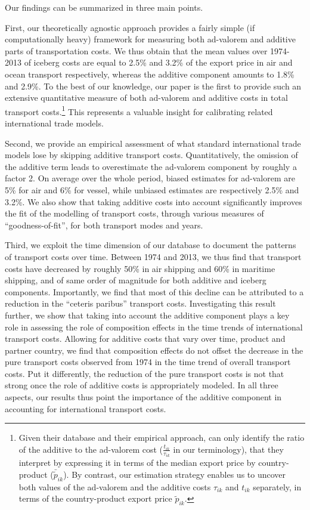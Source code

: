 \documentclass[a4paper,11pt]{article}
\begin{document}
Our findings can be summarized in three main points.

First, our theoretically agnostic approach provides a fairly simple (if computationally heavy) framework for measuring both ad-valorem and additive parts of transportation costs. We thus obtain that the mean values over 1974-2013 of iceberg costs are equal to 2.5\% and 3.2\% of the export price in air and ocean transport respectively, whereas the additive component amounts to 1.8\% and 2.9\%. To the best of our knowledge, our paper is the first to provide such an extensive quantitative measure of both ad-valorem and additive costs in total transport costs.\footnote{Given their database and their empirical approach, \citet{Irrazabal_2015} can only identify the ratio of the additive to the ad-valorem cost ($\frac{t_{ik}}{\tau_{ik}}$ in our terminology), that they interpret by expressing it in terms of the median export price by country-product ($\bar{\widetilde{p}}_{ik}$). By contrast, our estimation strategy enables us to uncover both values of the ad-valorem and the additive costs $\tau_{ik}$ and $t_{ik}$ separately, in terms of the country-product export price $\widetilde{p}_{ik}$.}  This represents a valuable insight for calibrating related international trade models.

Second, we provide an empirical assessment of what standard international trade models lose by skipping additive transport costs. Quantitatively, the omission of the additive term leads to overestimate the ad-valorem component by roughly a factor 2. On average over the whole period, biased estimates for ad-valorem are 5\% for air and 6\% for vessel, while unbiased estimates are respectively 2.5\% and 3.2\%. We also show that taking additive costs into account significantly improves the fit of the modelling of transport costs, through various measures of ``goodness-of-fit'', for both transport modes and years.

Third, we exploit the time dimension of our database to document the patterns of transport costs over time. Between 1974 and 2013, we thus find that transport costs have decreased by roughly 50\% in air shipping and 60\% in maritime shipping, and of same order of magnitude for both additive and iceberg components. Importantly, we find that most of this decline can be attributed to a reduction in the ``ceteris paribus'' transport costs. Investigating this result further, we show that taking into account the additive component plays a key role in assessing the role of composition effects in the time trends of international transport costs. Allowing for additive costs that vary over time, product and partner country, we find that composition effects do not offset the decrease in the pure transport costs observed from 1974 in the time trend of overall transport costs. Put it differently, the reduction of the pure transport costs is not that strong once the role of additive costs is appropriately modeled. In all three aspects, our results thus point the importance of the additive component in accounting for international transport costs.\smallskip
\end{document}
